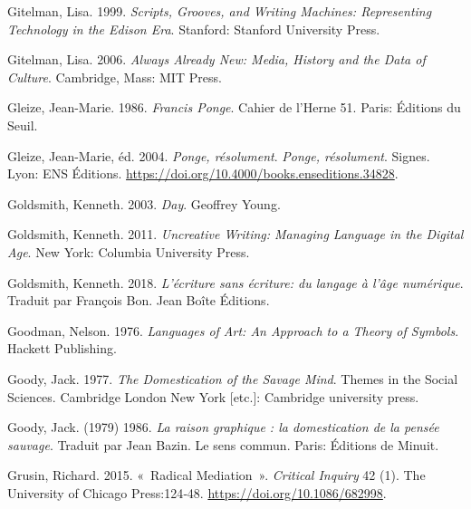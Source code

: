 \begin{CSLReferences}{1}{0}
\leavevmode{}%
Gitelman, Lisa. 1999. \emph{Scripts, {Grooves}, and {Writing Machines}:
{Representing Technology} in the {Edison Era}}. {Stanford}: {Stanford
University Press}.

\leavevmode{}%
Gitelman, Lisa. 2006. \emph{Always {Already New}: {Media}, {History} and
the {Data} of {Culture}}. {Cambridge, Mass}: {MIT Press}.

\leavevmode{}%
Gleize, Jean-Marie. 1986. \emph{Francis {Ponge}}. Cahier de l'{Herne}
51. {Paris}: {{É}ditions du Seuil}.

\leavevmode{}%
Gleize, Jean-Marie, éd. 2004. \emph{{Ponge, r{é}solument}}. \emph{Ponge,
r{é}solument}. {Signes}. {Lyon}: {ENS {É}ditions}.
\url{https://doi.org/10.4000/books.enseditions.34828}.

\leavevmode{}%
Goldsmith, Kenneth. 2003. \emph{Day}. {Geoffrey Young}.

\leavevmode{}%
Goldsmith, Kenneth. 2011. \emph{Uncreative {Writing}: {Managing
Language} in the {Digital Age}}. {New York}: {Columbia University
Press}.

\leavevmode{}%
Goldsmith, Kenneth. 2018. \emph{{L'{é}criture sans {é}criture: du
langage {à} l'{â}ge num{é}rique}}. Traduit par François Bon. {Jean
Bo{î}te {É}ditions}.

\leavevmode{}%
Goodman, Nelson. 1976. \emph{Languages of {Art}: {An Approach} to a
{Theory} of {Symbols}}. {Hackett Publishing}.

\leavevmode{}%
Goody, Jack. 1977. \emph{The {Domestication} of the {Savage Mind}}.
Themes in the Social Sciences. {Cambridge London New York {[}etc.{]}}:
{Cambridge university press}.

\leavevmode{}%
Goody, Jack. (1979) 1986. \emph{{La raison graphique : la domestication
de la pens{é}e sauvage}}. Traduit par Jean Bazin. {Le sens commun}.
{Paris}: {{É}ditions de Minuit}.

\leavevmode{}%
Grusin, Richard. 2015. {«~Radical {Mediation}~»}. \emph{Critical
Inquiry} 42 (1). {The University of Chicago Press}:124‑48.
\url{https://doi.org/10.1086/682998}.


\end{CSLReferences}
